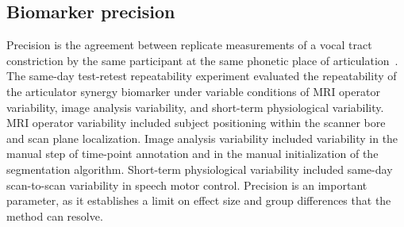 \documentclass[preprint]{JASAnew}
\begin{document}
\subsection{Biomarker precision}

Precision is the agreement between replicate measurements of a vocal tract constriction by the same participant at the same phonetic place of articulation~\citep{kessler2015emerging,sullivan2015metrology}. 
%
The same-day test-retest repeatability experiment evaluated the repeatability of the articulator synergy biomarker under variable conditions of MRI operator variability, image analysis variability, and short-term physiological variability. 
%
MRI operator variability included subject positioning within the scanner bore and scan plane localization. 
%
Image analysis variability included variability in the manual step of time-point annotation and in the manual initialization of the segmentation algorithm. 
%
Short-term physiological variability included same-day scan-to-scan variability in speech motor control. 
%
Precision is an important parameter, as it establishes a limit on effect size and group differences that the method can resolve.
\end{document}
